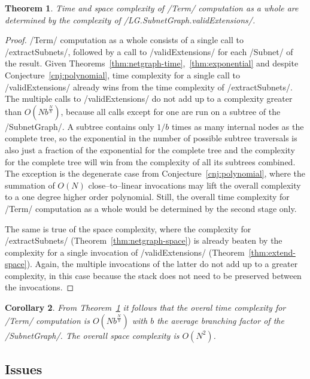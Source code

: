 \documentclass[12pt,a4paper]{article}
\newtheorem{theorem}{Theorem}
\newtheorem{corollary}[theorem]{Corollary}
\begin{document}
\begin{theorem}\label{thm:deciding-complexity}
    Time and space complexity of \hs/Term/ computation as a whole are determined by the complexity of \hs/LG.SubnetGraph.validExtensions/.
\end{theorem}
\begin{proof}
    \hs/Term/ computation as a whole consists of a single call to \hs/extractSubnets/, followed by a call to \hs/validExtensions/ for each \hs/Subnet/ of the result. Given Theorems~\ref{thm:netgraph-time},~\ref{thm:exponential} and despite Conjecture~\ref{cnj:polynomial}, time complexity for a single call to \hs/validExtensions/ already wins from the time complexity of \hs/extractSubnets/. The multiple calls to \hs/validExtensions/ do not add up to a complexity greater than $O(Nb^{\frac{N}{b}})$, because all calls except for one are run on a subtree of the \hs/SubnetGraph/. A subtree contains only $1/b$ times as many internal nodes as the complete tree, so the exponential in the number of possible subtree traversals is also just a fraction of the exponential for the complete tree and the complexity for the complete tree will win from the complexity of all its subtrees combined. The exception is the degenerate case from Conjecture~\ref{cnj:polynomial}, where the summation of $O(N)$ close--to--linear invocations may lift the overall complexity to a one degree higher order polynomial. Still, the overall time complexity for \hs/Term/ computation as a whole would be determined by the second stage only.
    
    The same is true of the space complexity, where the complexity for \hs/extractSubnets/ (Theorem~\ref{thm:netgraph-space}) is already beaten by the complexity for a single invocation of \hs/validExtensions/ (Theorem~\ref{thm:extend-space}). Again, the multiple invocations of the latter do not add up to a greater complexity, in this case because the stack does not need to be preserved between the invocations.
\end{proof}

\begin{corollary}
    From Theorem~\ref{thm:deciding-complexity} it follows that the overal time complexity for \hs/Term/ computation is $O(Nb^{\frac{N}{b}})$ with $b$ the average branching factor of the \hs/SubnetGraph/. The overall space complexity is $O(N^2)$.
\end{corollary}


\subsection{Issues}\label{sub:issues}
\end{document}
